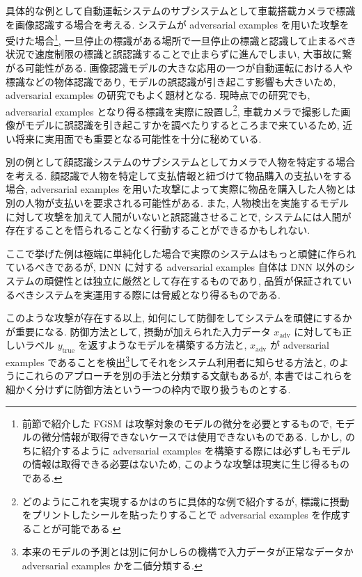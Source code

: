 具体的な例として自動運転システムのサブシステムとして車載搭載カメラで標識を画像認識する場合を考える.
システムが adversarial examples を用いた攻撃を受けた場合\footnote{
前節で紹介した FGSM は攻撃対象のモデルの微分を必要とするもので, モデルの微分情報が取得できないケースでは使用できないものである.
しかし, のちに紹介するように adversarial examples を構築する際には必ずしもモデルの情報は取得できる必要はないため, このような攻撃は現実に生じ得るものである.
}, 一旦停止の標識がある場所で一旦停止の標識と認識して止まるべき状況で速度制限の標識と誤認識することで止まらずに進んでしまい, 大事故に繋がる可能性がある.
画像認識モデルの大きな応用の一つが自動運転における人や標識などの物体認識であり, モデルの誤認識が引き起こす影響も大きいため, adversarial examples の研究でもよく題材となる.
現時点での研究でも, adversarial examples となり得る標識を実際に設置し\footnote{どのようにこれを実現するかはのちに具体的な例で紹介するが, 標識に摂動をプリントしたシールを貼ったりすることで adversarial examples を作成することが可能である.}, 車載カメラで撮影した画像がモデルに誤認識を引き起こすかを調べたりするところまで来ているため, 近い将来に実用面でも重要となる可能性を十分に秘めている.

別の例として顔認識システムのサブシステムとしてカメラで人物を特定する場合を考える.
顔認識で人物を特定して支払情報と紐づけて物品購入の支払いをする場合, adversarial examples を用いた攻撃によって実際に物品を購入した人物とは別の人物が支払いを要求される可能性がある.
また, 人物検出を実施するモデルに対して攻撃を加えて人間がいないと誤認識させることで, システムには人間が存在することを悟られることなく行動することができるかもしれない.

ここで挙げた例は極端に単純化した場合で実際のシステムはもっと頑健に作られているべきであるが, DNN に対する adversarial examples 自体は DNN 以外のシステムの頑健性とは独立に厳然として存在するものであり, 品質が保証されているべきシステムを実運用する際には脅威となり得るものである.

このような攻撃が存在する以上, 如何にして防御をしてシステムを頑健にするかが重要になる.
防御方法として, 摂動が加えられた入力データ $x_{\text{adv}}$ に対しても正しいラベル $y_{\text{true}}$ を返すようなモデルを構築する方法と,  $x_{\text{adv}}$ が adversarial examples であることを検出\footnote{
本来のモデルの予測とは別に何かしらの機構で入力データが正常なデータか adversarial examples かを二値分類する.
}してそれをシステム利用者に知らせる方法と, のようにこれらのアプローチを別の手法と分類する文献もあるが, 本書ではこれらを細かく分けずに防御方法という一つの枠内で取り扱うものとする.

